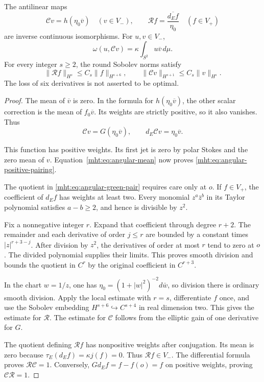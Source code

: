 \begin{proposition}\label{mht:prop:angular-polarization}
The antilinear maps
\begin{equation}\label{mht:eq:angular-green-pair}
 \mathcal Cv=h(\eta_0\overline v)\quad(v\in V_-),
 \qquad
 \mathcal Rf=\overline{\frac{d_Ef}{\eta_0}}\quad(f\in V_+)
\end{equation}
are inverse continuous isomorphisms. For $u,v\in V_-$,
\begin{equation}\label{mht:eq:angular-positive-pairing}
 \omega(u,\mathcal Cv)
       =\kappa\int_{S^2}u\overline v\,d\mu.
\end{equation}
For every integer $s\geq2$, the round Sobolev norms satisfy
\[
 \|\mathcal Rf\|_{H^s}\leq C_s\|f\|_{H^{s+6}},
 \qquad
 \|\mathcal Cv\|_{H^{s+1}}\leq C_s\|v\|_{H^s}.
\]
The loss of six derivatives is not asserted to be optimal.
\end{proposition}

\begin{proof}
The mean of $\overline v$ is zero. In the formula for
$h(\eta_0\overline v)$, the other scalar correction is the mean of
$f_0\overline v$. Its weights are strictly positive, so it also
vanishes. Thus
\[
 \mathcal Cv=G(\eta_0\overline v),\qquad
 d_E\mathcal Cv=\eta_0\overline v.
\]

This function has positive weights. Its first jet is zero by polar
Stokes and the zero mean of $v$. Equation~\eqref{mht:eq:angular-mean}
now proves \eqref{mht:eq:angular-positive-pairing}.

The quotient in \eqref{mht:eq:angular-green-pair} requires care only
at $o$. If $f\in V_+$, the coefficient of $d_Ef$ has weights at
least two. Every monomial $z^a\bar z^b$ in its Taylor polynomial
satisfies $a-b\geq2$, and hence is divisible by $z^2$.

Fix a nonnegative integer $r$. Expand that coefficient through
degree $r+2$. The remainder and each derivative of order $j\leq r$
are bounded by a constant times $|z|^{r+3-j}$. After division by
$z^2$, the derivatives of order at most $r$ tend to zero at $o$.
The divided polynomial supplies their limits. This proves smooth
division and bounds the quotient in $C^r$ by the original coefficient
in $C^{r+3}$.

In the chart $w=1/z$, one has
$\eta_0=(1+|w|^2)^{-2}d\bar w$, so division there is ordinary
smooth division. Apply the local estimate with $r=s$, differentiate
$f$ once, and use the Sobolev embedding
$H^{s+6}\hookrightarrow C^{s+4}$ in real dimension two.
This gives the estimate for $\mathcal R$. The estimate for
$\mathcal C$ follows from the elliptic gain of one derivative for $G$.

The quotient defining $\mathcal Rf$ has nonpositive weights after
conjugation. Its mean is zero because
$\tau_E(d_Ef)=\kappa j(f)=0$. Thus $\mathcal Rf\in V_-$.
The differential formula proves $\mathcal R\mathcal C=1$.
Conversely, $Gd_Ef=f-f(o)=f$ on positive weights, proving
$\mathcal C\mathcal R=1$.
\end{proof}

